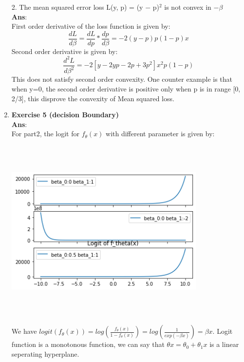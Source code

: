 \documentclass{article}
\begin{document}
\begin{enumerate}
2. The mean squared error loss L(y, p) = (y − p)$^2$ is not convex in $−\beta$ \\
\textbf{Ans}: \\
First order derivative of the loss function is given by: 
$$\frac{dL}{d\beta}=\frac{dL}{dp}*\frac{dp}{d\beta}=-2(y-p)p(1-p)x$$
Second order derivative is given by: 
$$
\frac{d^2L}{d\beta^2}=-2[y-2yp-2p+3p^2]x^2p(1-p)
$$
This does not satisfy second order convexity. One counter example is that when y=0, the second order derivative is positive only when p is in range [0, 2/3], this disprove the convexity of Mean squared loss. 

\item \textbf{Exercise 5 (decision Boundary)} \\ 
\textbf{Ans}: \\
For part2, the logit for $f_\theta(x)$ with different parameter is given by: \\
\includegraphics[width=10cm, height=10cm]{Assign1plot1.png} \\
We have $logit(f_\theta(x))=log(\frac{f_\theta(x)}{1-f_\theta(x)})=log(\frac{1}{exp(-\beta x)})=\beta x$. Logit function is a monotonous function, we can say that $\theta x=\theta_0+\theta_1x$ is a linear seperating hyperplane. 

  

\end{enumerate}
\end{document}
